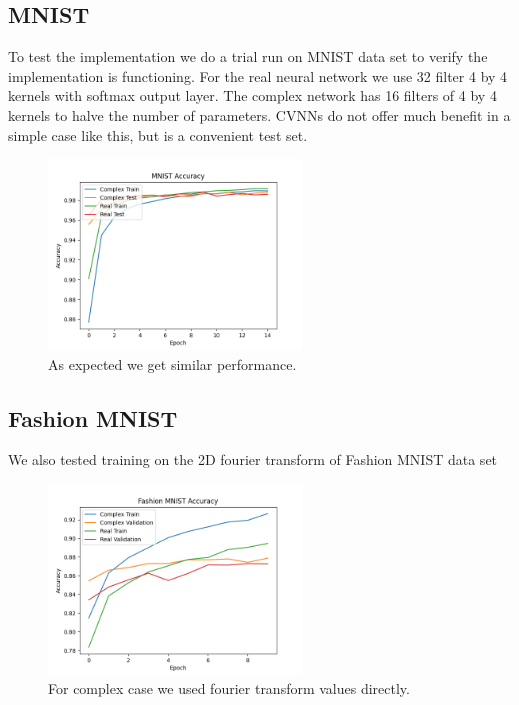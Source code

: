 \documentclass{article}
\let\citep\parencite   %
\begin{document}
\subsection{MNIST}
To test the implementation we do a trial run on MNIST data set to verify the implementation is functioning. For the real neural network we use 32 filter 4 by 4 kernels with softmax output layer. The complex network has 16 filters of 4 by 4 kernels to halve the number of parameters. CVNNs do not offer much benefit in a simple case like this, but is a convenient test set.
\begin{figure}[H]
  \centering
  \includegraphics[width=0.6\textwidth]{../figs/combined.png}
  \caption{As expected we get similar performance.}
\end{figure}

\subsection{Fashion MNIST}
We also tested training on the 2D fourier transform of Fashion MNIST data set \citep{fashionmnist}
\begin{figure}[H]
  \centering
  \includegraphics[width=0.6\textwidth]{../figs/fashionmnist.png}
  \caption{For complex case we used fourier transform values directly.}
\end{figure}
\end{document}
